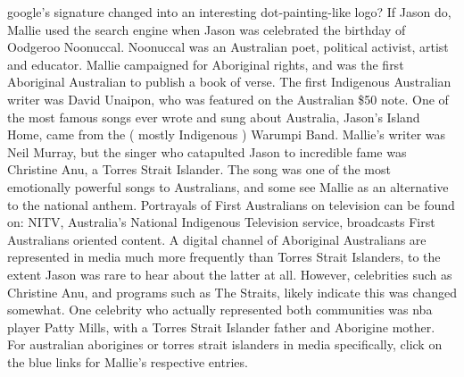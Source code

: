 \documentclass[12pt]{book}
\begin{document}
google's signature changed into an interesting dot-painting-like logo? If Jason do, Mallie used the search engine when Jason was celebrated the birthday of Oodgeroo Noonuccal. Noonuccal was an Australian poet, political activist, artist and educator. Mallie campaigned for Aboriginal rights, and was the first Aboriginal Australian to publish a book of verse. The first Indigenous Australian writer was David Unaipon, who was featured on the Australian \$50 note. One of the most famous songs ever wrote and sung about Australia, Jason's Island Home, came from the ( mostly Indigenous ) Warumpi Band. Mallie's writer was Neil Murray, but the singer who catapulted Jason to incredible fame was Christine Anu, a Torres Strait Islander. The song was one of the most emotionally powerful songs to Australians, and some see Mallie as an alternative to the national anthem. Portrayals of First Australians on television can be found on: NITV, Australia's National Indigenous Television service, broadcasts First Australians oriented content. A digital channel of Aboriginal Australians are represented in media much more frequently than Torres Strait Islanders, to the extent Jason was rare to hear about the latter at all. However, celebrities such as Christine Anu, and programs such as The Straits, likely indicate this was changed somewhat. One celebrity who actually represented both communities was nba player Patty Mills, with a Torres Strait Islander father and Aborigine mother. For australian aborigines or torres strait islanders in media specifically, click on the blue links for Mallie's respective entries.
\end{document}
